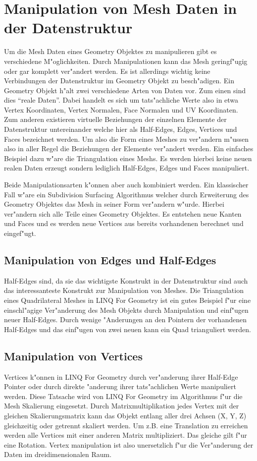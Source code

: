 \documentclass[pagesize, paper=a4, fontsize=12pt,titlepage=true, headings=small, headnosepline, abstractoff, liststotoc, nochapterprefix, plainheadsepline]{scrreprt}
\newcommand{\LFGS}{LINQ For Geometry }
\begin{document}
	\section {Manipulation von Mesh Daten in der Datenstruktur}
		Um die Mesh Daten eines Geometry Objektes zu manipulieren gibt es verschiedene M"oglichkeiten. Durch Manipulationen kann das Mesh geringf"ugig oder gar komplett ver"andert werden. Es ist allerdings wichtig keine Verbindungen der Datenstruktur im Geometry Objekt zu besch"adigen. Ein Geometry Objekt h"alt zwei verschiedene Arten von Daten vor. Zum einen sind dies "`reale Daten"'. Dabei handelt es sich um tats"achliche Werte also in etwa Vertex Koordinaten, Vertex Normalen, Face Normalen und UV Koordinaten. Zum anderen existieren virtuelle Beziehungen der einzelnen Elemente der Datenstruktur untereinander welche hier als Half-Edges, Edges, Vertices und Faces bezeichnet werden. Um also die Form eines Meshes zu ver"andern m"ussen also in aller Regel die Beziehungen der Elemente ver"andert werden. Ein einfaches Beispiel dazu w"are die Triangulation eines Meshs. Es werden hierbei keine neuen realen Daten erzeugt sondern lediglich Half-Edges, Edges und Faces manipuliert.
\newline

Beide Manipulationsarten k"onnen aber auch kombiniert werden. Ein klassischer Fall w"are ein Subdivision Surfacing Algorithmus welcher durch Erweiterung des Geometry Objektes das Mesh in seiner Form ver"andern w"urde. Hierbei ver"andern sich alle Teile eines Geometry Objektes. Es entstehen neue Kanten und Faces und es werden neue Vertices aus bereits vorhandenen berechnet und eingef"ugt. 
		\subsection {Manipulation von Edges und Half-Edges}
			Half-Edges sind, da sie das wichtigste Konstrukt in der Datenstruktur sind auch das interessanteste Konstrukt zur Manipulation von Meshes. Die Triangulation eines Quadrilateral Meshes in \LFGS ist ein gutes Beispiel f"ur eine einschl"agige Ver"anderung des Mesh Objekts durch Manipulation und einf"ugen neuer Half-Edges. Durch wenige "Anderungen an den Pointern der vorhandenen Half-Edges und das einf"ugen von zwei neuen kann ein Quad trianguliert werden.

		\subsection {Manipulation von Vertices}
			Vertices k"onnen in \LFGS durch ver"anderung ihrer Half-Edge Pointer oder durch direkte "anderung ihrer tats"achlichen Werte manipuliert werden. Diese Tatsache wird von \LFGS im Algorithmus f"ur die Mesh Skalierung eingesetzt. Durch Matrixmultiplikation jedes Vertex mit der gleichen Skalierungsmatrix kann das Objekt entlang aller drei Achsen (X, Y, Z) gleichzeitig oder getrennt skaliert werden. Um z.B. eine Translation zu erreichen werden alle Vertices mit einer anderen Matrix multipliziert. Das gleiche gilt f"ur eine Rotation. Vertex manipulation ist also unersetzlich f"ur die Ver"anderung der Daten im dreidimensionalen Raum.
\end{document}
